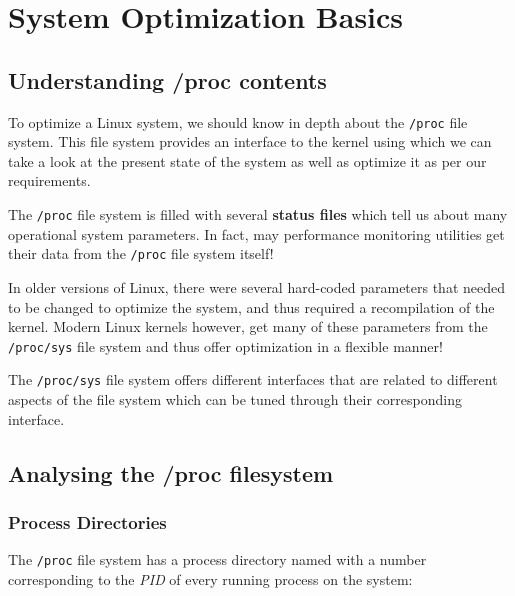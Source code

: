 \chapter{System Optimization Basics}
	
\section{Understanding /proc contents}
To optimize a Linux system, we should know in depth about the \verb|/proc| file system. This file system provides an interface to the kernel using which we can take a look at the present state of the system as well as optimize it as per our requirements. 

The \verb|/proc| file system is filled with several \textbf{status files} which tell us about many operational system parameters. In fact, may performance monitoring utilities get their data from the \verb|/proc| file system itself! 

In older versions of Linux, there were several hard-coded parameters that needed to be changed to optimize the system, and thus required a recompilation of the kernel. Modern Linux kernels however, get many of these parameters from the \verb|/proc/sys| file system and thus offer optimization in a flexible manner! 

The \verb|/proc/sys| file system offers different interfaces that are related to different aspects of the file system which can be tuned through their corresponding interface. 

\section{Analysing the /proc filesystem}
\subsection{Process Directories}
The \verb|/proc| file system has a process directory named with a number corresponding to the \textit{PID} of every running process on the system:

